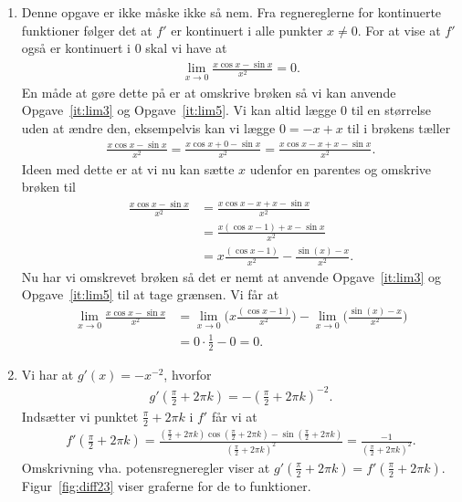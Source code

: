 \begin{enumerate}
	\item Denne opgave er ikke måske ikke så nem. Fra regnereglerne for kontinuerte funktioner følger det at $f'$ er kontinuert i alle punkter $x\neq 0$. For at vise at $f'$ også er kontinuert i $0$ skal vi have at 
	\begin{align*}
	\lim_{x\to 0} \frac{x\cos x-\sin x}{x^2}=0.
	\end{align*}
	En måde at gøre dette på er at omskrive brøken så vi kan anvende Opgave~\ref{it:lim3} og Opgave~\ref{it:lim5}. Vi kan altid lægge $0$ til en størrelse uden at ændre den, eksempelvis kan vi lægge $0=-x+x$ til i brøkens tæller
	\begin{align*}
	\frac{x\cos x-\sin x}{x^2}=\frac{x\cos x+0-\sin x}{x^2}=\frac{x\cos x-x+x-\sin x}{x^2}.
	\end{align*}
	Ideen med dette er at vi nu kan sætte $x$ udenfor en parentes og omskrive brøken til
	\begin{align*}
	\frac{x\cos x-\sin x}{x^2}&=\frac{x\cos x-x+x-\sin x}{x^2}\\
	&=\frac{x(\cos x-1)+x-\sin x}{x^2}\\
	&=x\frac{(\cos x-1)}{x^2}-\frac{\sin(x)-x}{x^2}.
	\end{align*}
	Nu har vi omskrevet brøken så det er nemt at anvende Opgave~\ref{it:lim3} og Opgave~\ref{it:lim5} til at tage grænsen. Vi får at
	\begin{align*}
	\lim_{x\to 0} \frac{x\cos x-\sin x}{x^2}&=\lim_{x\to 0}\Big(x\frac{(\cos x-1)}{x^2}\Big) -\lim_{x\to 0}\Big(\frac{\sin(x)-x}{x^2}\Big)\\&=0\cdot\frac{1}{2}-0=0.
	\end{align*}



	\item\label{it:diff23} Vi har at $g'(x)=-x^{-2}$, hvorfor
	\begin{align*}
	g'(\frac{\pi}{2}+2\pi k)=-(\frac{\pi}{2}+2\pi k)^{-2}.
	\end{align*}
	Indsætter vi punktet $ \frac{\pi}{2}+2\pi k $ i $f'$ får vi at
	\begin{align*}
	f'(\frac{\pi}{2}+2\pi k)=\frac{(\frac{\pi}{2}+2\pi k)\cos(\frac{\pi}{2}+2\pi k)-\sin (\frac{\pi}{2}+2\pi k)}{(\frac{\pi}{2}+2\pi k)^2}=\frac{-1}{(\frac{\pi}{2}+2\pi k)^2}.
	\end{align*}
	Omskrivning vha. potensregneregler viser at $g'(\frac{\pi}{2}+2\pi k)=f'(\frac{\pi}{2}+2\pi k)$. Figur~\ref{fig:diff23} viser graferne for de to funktioner.
	

\end{enumerate}
